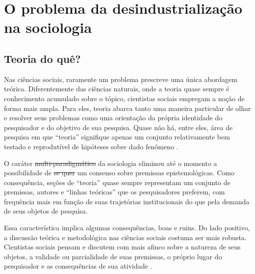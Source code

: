 \chapter{O problema da desindustrialização na sociologia}

\section{Teoria do quê?}

Nas ciências sociais, raramente um problema prescreve uma única abordagem teórica. Diferentemente das ciências naturais, onde a teoria quase sempre é conhecimento acumulado sobre o tópico, cientistas sociais empregam a noção de forma mais ampla. Para eles, teoria abarca tanto uma maneira particular de olhar e resolver seus problemas como uma orientação da própria identidade do pesquisador e do objetivo de sua pesquisa. Quase não há, entre eles, área de pesquisa em que ``teoria'' signifique apenas
um conjunto relativamente bem testado e reprodutível de hipóteses sobre dado
fenômeno . 

O caráter \sout{multi-paradigmático} da sociologia  eliminou até o momento
a possibilidade de \sout{se quer} um consenso sobre premissas epistemológicas.
Como consequência, seções de ``teoria'' quase sempre representam
um conjunto de premissas, autores e ``linhas teóricas'' que os pesquisadores preferem, com frequência mais em função de suas trajetórias institucionais do que pela demanda de seus objetos de pesquisa. 


Essa característica implica algumas consequências, boas e ruins. Do lado positivo, a discussão teórica e metodológica nas ciências sociais costuma ser mais robusta. Cientistas sociais pensam e discutem com mais
afinco sobre a natureza de seus objetos, a validade ou parcialidade de suas premissas,
o próprio lugar do pesquisador e as consequências de sua atividade .

